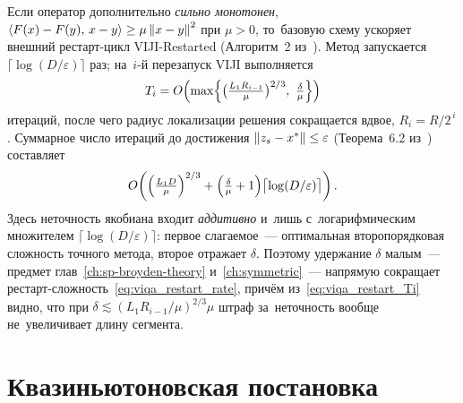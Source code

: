 Если оператор дополнительно \emph{сильно монотонен},
$\langle F(x)-F(y),\,x-y\rangle\ge\mu\left\|x-y\right\|^2$ при $\mu>0$, то~базовую
схему ускоряет внешний рестарт-цикл VIJI-Restarted (Алгоритм~2
из~\cite{viqa2024}). Метод запускается $\lceil\log(D/\varepsilon)\rceil$
раз; на~$i$-й перезапуск VIJI выполняется
\begin{equation}\label{eq:viqa_restart_Ti}
  T_i = O\!\left(\max\Bigl\{
     \bigl(\tfrac{L_1 R_{i-1}}{\mu}\bigr)^{2/3},\ \tfrac{\delta}{\mu}
     \Bigr\}\right)
\end{equation}
итераций, после чего радиус локализации решения сокращается вдвое,
$R_i = R/2^{\,i}$. Суммарное число итераций до достижения
$\left\|z_s-x^*\right\|\le\varepsilon$ (Теорема~6.2 из~\cite{viqa2024}) составляет
\begin{equation}\label{eq:viqa_restart_rate}
  O\!\left(\Bigl(\tfrac{L_1 D}{\mu}\Bigr)^{2/3}
           + \Bigl(\tfrac{\delta}{\mu}+1\Bigr)
             \bigl\lceil\log(D/\varepsilon)\bigr\rceil\right).
\end{equation}
Здесь неточность якобиана входит \emph{аддитивно} и~лишь
с~логарифмическим множителем $\lceil\log(D/\varepsilon)\rceil$: первое
слагаемое~--- оптимальная второпорядковая сложность точного метода, второе
отражает $\delta$. Поэтому удержание $\delta$ малым~--- предмет
глав~\ref{ch:sp-broyden-theory} и~\ref{ch:symmetric}~--- напрямую
сокращает рестарт-сложность~\eqref{eq:viqa_restart_rate}, причём
из~\eqref{eq:viqa_restart_Ti} видно, что при $\delta\lesssim
(L_1 R_{i-1}/\mu)^{2/3}\mu$ штраф за~неточность вообще не~увеличивает длину
сегмента.


\section{Квазиньютоновская постановка}\label{sec:viqa_qn}

